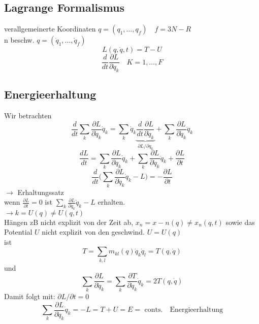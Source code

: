 \documentclass[titlepage,12pt,a4paper,ngerman]{report}
\newcommand{\tx}[1]{\textrm{#1}}
\begin{document}
\subsection{Lagrange Formalismus}
verallgemeinerte Koordinaten $q = ( q_1, \dots , q_f) \quad f = 3N-R$\\ 
n beschw. $q = (\dot q_1, \dots , \dot q_f)$
$$L ( q, \dot q, t) = T- U$$
$$\frac{d}{dt} \frac{\partial L}{\partial \dot q_k} \quad K = 1, \dots, F$$
\subsection{Energieerhaltung}
Wir betrachten
$$\frac{d}{dt} \sum_k \frac{\partial L}{\partial \dot q_k} \dot q_k  = \sum_k \dot q_k \underbrace{\frac{d}{dt} \frac{\partial L}{\partial \dot q_k}}_{\partial L / \partial q_k} + \sum_k \frac{\partial L}{\partial \dot q_k} \ddot q_k$$
$$\frac{dL}{dt}= \sum_k \frac{\partial L}{\partial q_k} \dot q_k + \sum_k \frac{\partial L}{\partial \dot q_k} \ddot q_k + \frac{\partial L}{\partial t}$$
$$\frac{d}{dt} \bigg( \sum_k \frac{\partial L}{\partial \dot q_k} \dot q_k - L \bigg) = -\frac{\partial L}{\partial t}$$
$\rightarrow$ Erhaltungssatz\\
wenn $\frac{\partial L}{\partial t} = 0$ ist $\sum_k \frac{\partial L}{\partial \dot q_k} \dot q_k - L$ erhalten.\\
$\rightarrow k = U(q) \neq U(q,t)$\\
Hängen zB nicht explizit von der Zeit ab, $x_n = x-n(q) \neq x_n (q,t)$ sowie das Potential $U$ nicht explizit von den geschwind. $U = U(q)$\\
ist $$T = \sum_{k,l} m_{kl}(q) \dot q_k \dot q_l = T (q, \dot q)$$
und $$\sum_{k} \frac{\partial L}{\partial \dot q_k} = \sum_{k} \frac{\partial T}{\partial \dot q_k} \dot q_k = 2T(q,\dot q)$$
Damit folgt mit: $\partial L/ \partial t = 0$
$$\sum_k \frac{\partial L }{\partial \dot q_k}\dot q_k = - L = T+U = E = \tx{ conts.} \quad \tx{Energieerhaltung}$$
\end{document}

